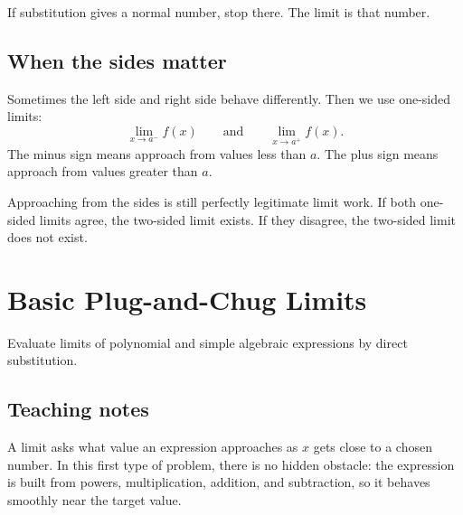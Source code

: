 \documentclass[11pt,oneside]{book}
\newenvironment{rulebox}[1]{\par\medskip\noindent{\color{navy}\bfseries #1}\par\noindent{\color{navy}\hrule}\smallskip}{\par\smallskip\noindent{\color{navy}\hrule}\par\medskip}
\begin{document}
If substitution gives a normal number, stop there. The limit is that number.

\section*{When the sides matter}
Sometimes the left side and right side behave differently. Then we use one-sided limits:
\[
\lim_{x\to a^-}f(x) \qquad \text{and} \qquad \lim_{x\to a^+}f(x).
\]
The minus sign means approach from values less than $a$. The plus sign means approach from values greater than $a$.

\begin{center}
\end{center}

Approaching from the sides is still perfectly legitimate limit work. If both one-sided limits agree, the two-sided limit exists. If they disagree, the two-sided limit does not exist.

\mainmatter

\chapter{Basic Plug-and-Chug Limits}
\begin{rulebox}{Learning target}
Evaluate limits of polynomial and simple algebraic expressions by direct substitution.
\end{rulebox}
\section*{Teaching notes}
A limit asks what value an expression approaches as $x$ gets close to a chosen number. In this first type of problem, there is no hidden obstacle: the expression is built from powers, multiplication, addition, and subtraction, so it behaves smoothly near the target value.
\end{document}
